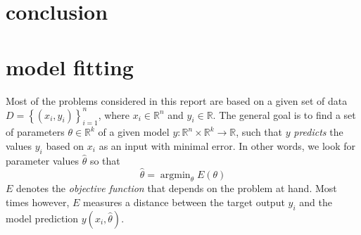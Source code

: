 \documentclass{article}
\DeclareMathOperator*{\argmin}{argmin} %
\begin{document}
\section{conclusion}



























\section{model fitting}
\label{sec:models}
Most of the problems considered in this report are based on a given set of data $D = \left\{ (x_i,y_i) \right\} _{i=1}^n$, where $x_i \in \mathbb{R}^n$ and $y_i \in \mathbb{R}$. The general goal is to find a set of parameters $\theta \in \mathbb{R}^k$ of a given model $y:\mathbb{R}^n \times \mathbb{R}^k \to \mathbb{R}$, such that $y$ \emph{predicts} the values $y_i$ based on $x_i$ as an input with minimal error. In other words, we look for parameter values $\hat{\theta}$ so that
\begin{equation} \label{eq:argmin}
\hat{\theta} = \argmin_\theta E(\theta)
\end{equation}
$E$ denotes the \emph{objective function} that depends on the problem at hand. Most times however, $E$ measures a distance between the target output $y_i$ and the model prediction $y(x_i,\hat{\theta})$.
\end{document}
